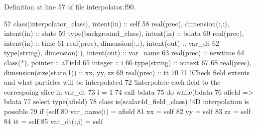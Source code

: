 Definition at line 57 of file interpolator.\+f90.


\begin{DoxyCode}
57     \textcolor{keywordtype}{class}(interpolator\_class), \textcolor{keywordtype}{intent(in)} :: self
58     \textcolor{keywordtype}{real(prec)}, \textcolor{keywordtype}{dimension(:,:)}, \textcolor{keywordtype}{intent(in)} :: state
59     \textcolor{keywordtype}{type}(background\_class), \textcolor{keywordtype}{intent(in)} :: bdata
60     \textcolor{keywordtype}{real(prec)}, \textcolor{keywordtype}{intent(in)} :: time
61     \textcolor{keywordtype}{real(prec)}, \textcolor{keywordtype}{dimension(:,:)}, \textcolor{keywordtype}{intent(out)} :: var\_dt
62     \textcolor{keywordtype}{type}(string), \textcolor{keywordtype}{dimension(:)}, \textcolor{keywordtype}{intent(out)} :: var\_name
63     \textcolor{keywordtype}{real(prec)} :: newtime
64     \textcolor{keywordtype}{class}(*), \textcolor{keywordtype}{pointer} :: aField
65     \textcolor{keywordtype}{integer} :: i
66     \textcolor{keywordtype}{type}(string) :: outext
67 
68     \textcolor{keywordtype}{real(prec)}, \textcolor{keywordtype}{dimension(size(state,1))} :: xx, yy, zz
69     \textcolor{keywordtype}{real(prec)} :: tt
70 
71     \textcolor{comment}{!Check field extents and what particles will be interpolated}
72     \textcolor{comment}{!interpolate each field to the correspoing slice in var\_dt}
73     i = 1
74     \textcolor{keyword}{call }bdata%
75     \textcolor{keywordflow}{do} \textcolor{keywordflow}{while}(bdata%
76         afield => bdata%
77         \textcolor{keywordflow}{select type}(afield)
78 \textcolor{keywordflow}{        class is}(scalar4d\_field\_class)          \textcolor{comment}{!4D interpolation is possible}
79             \textcolor{keywordflow}{if} (self%
80                 var\_name(i) = afield%
81                 xx = self%
82                 yy = self%
83                 zz = self%
84                 tt = self%
85                 var\_dt(:,i) = self%

\end{DoxyCode}
